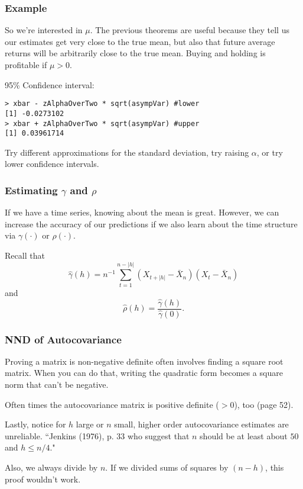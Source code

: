 \documentclass{beamer}
\begin{document}
\begin{frame}[fragile]
\frametitle{Example}

So we're interested in $\mu$. The previous theorems are useful because they tell us our estimates get very close to the true mean, but also that future average returns will be arbitrarily close to the true mean. Buying and holding is profitable if $\mu > 0$.
\newline

95\% Confidence interval: 
\begin{verbatim}
> xbar - zAlphaOverTwo * sqrt(asympVar) #lower
[1] -0.0273102
> xbar + zAlphaOverTwo * sqrt(asympVar) #upper
[1] 0.03961714
\end{verbatim}

Try different approximations for the standard deviation, try raising $\alpha$, or try lower confidence intervals.
\end{frame}



\begin{frame}
\frametitle{Estimating $\gamma$ and $\rho$}

If we have a time series, knowing about the mean is great. However, we can increase the accuracy of our predictions if we also learn about the time structure via $\gamma(\cdot)$ or $\rho(\cdot)$.
\newline

Recall that 
\[
\hat{\gamma}(h) = n^{-1}\sum_{t=1}^{n-|h|}(X_{t+|h|}-\bar{X}_n)(X_t - \bar{X}_n)
\]
and 
\[
\hat{\rho}(h) = \frac{\hat{\gamma}(h) }{\hat{\gamma}(0)}.
\]

\end{frame}


\begin{frame}
\frametitle{NND of Autocovariance}

Proving a matrix is non-negative definite often involves finding a square root matrix. When you can do that, writing the quadratic form becomes a square norm that can't be negative. 
\newline

Often times the autocovariance matrix is positive definite ($>0$), too (page 52).
\newline

Lastly, notice for $h$ large or $n$ small, higher order autocovariance estimates are unreliable. ``Jenkins (1976), p. 33 who suggest that $n$ should be at least about $50$ and $h \le n/4$."
\newline

Also, we always divide by $n$. If we divided sums of squares by $(n-h)$, this proof wouldn't work.

\end{frame}
\end{document}
